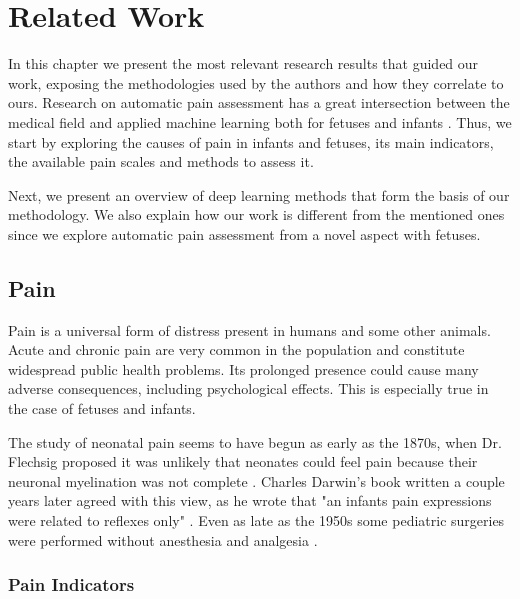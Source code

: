 \chapter{Related Work}

In this chapter we present the most relevant research results that guided our work, exposing the methodologies used by the authors and how they correlate to ours. Research on automatic pain assessment has a great intersection between the medical field and applied machine learning both for fetuses and infants \citep{ZamzmiPGKSA16, Bellieni2012}. Thus, we start by exploring the causes of pain in infants and fetuses, its main indicators, the available pain scales and methods to assess it. 

Next, we present an overview of deep learning methods that form the basis of our methodology. We also explain how our work is different from the mentioned ones since we explore automatic pain assessment from a novel aspect with fetuses.

\section{Pain}

Pain is a universal form of distress present in humans and some other animals. Acute and chronic pain are very common in the population and constitute widespread public health problems. Its prolonged presence could cause many adverse consequences, including psychological effects. This is especially true in the case of fetuses and infants.

The study of neonatal pain seems to have begun as early as the 1870s, when Dr. Flechsig proposed it was unlikely that neonates could feel pain because their neuronal myelination was not complete \citep{cope1998neonatal}. Charles Darwin's book written a couple years later agreed with this view, as he wrote that "an infants pain expressions were related to reflexes only" \citep{darwin1872expression}. Even as late as the 1950s some pediatric surgeries were performed without anesthesia and analgesia \citep{cope1998neonatal}.


\subsection{Pain Indicators}

